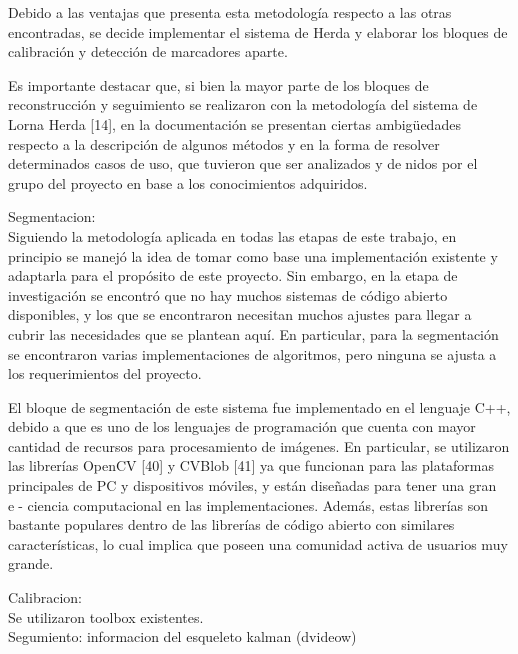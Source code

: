 Debido a las ventajas que presenta esta metodología respecto a las otras encontradas,
se decide implementar el sistema de Herda y elaborar los bloques de
calibración y detección de marcadores aparte.

Es importante destacar que, si bien la
mayor parte de los bloques de reconstrucción y seguimiento se realizaron con la
metodología del sistema de Lorna Herda [14], en la documentación se presentan
ciertas ambigüedades respecto a la descripción de algunos métodos y en la forma
de resolver determinados casos de uso, que tuvieron que ser analizados y denidos
por el grupo del proyecto en base a los conocimientos adquiridos.

Segmentacion:\\

Siguiendo la metodología aplicada en todas las etapas de este trabajo, en principio
se manejó la idea de tomar como base una implementación existente y adaptarla
para el propósito de este proyecto. Sin embargo, en la etapa de investigación
se encontró que no hay muchos sistemas de código abierto disponibles, y los que se
encontraron necesitan muchos ajustes para llegar a cubrir las necesidades que se
plantean aquí. En particular, para la segmentación se encontraron varias implementaciones
de algoritmos, pero ninguna se ajusta a los requerimientos del proyecto.

El bloque de segmentación de este sistema fue implementado en el lenguaje
C++, debido a que es uno de los lenguajes de programación que cuenta con mayor
cantidad de recursos para procesamiento de imágenes. En particular, se utilizaron
las librerías OpenCV [40] y CVBlob [41] ya que funcionan para las plataformas
principales de PC y dispositivos móviles, y están diseñadas para tener una gran e-
ciencia computacional en las implementaciones. Además, estas librerías son bastante
populares dentro de las librerías de código abierto con similares características,
lo cual implica que poseen una comunidad activa de usuarios muy grande.

Calibracion:\\

Se utilizaron toolbox existentes.\\



Segumiento:
	informacion del esqueleto
	kalman (dvideow)
	
	







